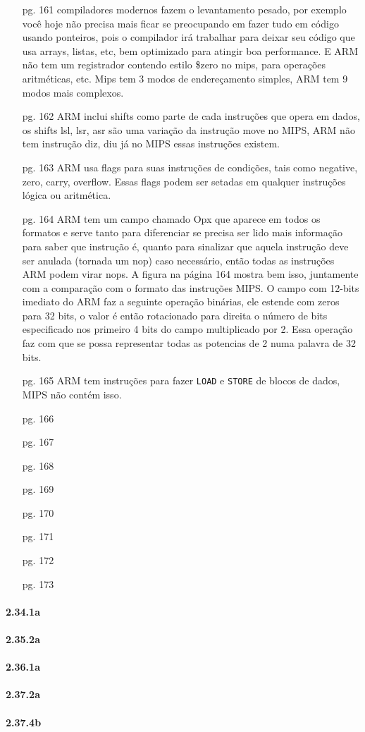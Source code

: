 \documentclass{article}
\begin{document}
\begin{enumerate}

\item[pg. 161] compiladores modernos fazem o levantamento pesado, por exemplo
você hoje não precisa mais ficar se preocupando em fazer tudo em código usando
ponteiros, pois o compilador irá trabalhar para deixar seu código que usa
arrays, listas, etc, bem optimizado para atingir boa performance. E ARM não tem
um registrador contendo estilo \$zero no mips, para operações aritméticas, etc.
Mips tem 3 modos de endereçamento simples, ARM tem 9 modos mais complexos.
\item[pg. 162] ARM inclui shifts como parte de cada instruções que opera em
dados, os shifts lsl, lsr, asr são uma variação da instrução move no MIPS, ARM
não tem instrução diz, diu já no MIPS essas instruções existem. \item[pg. 163]
ARM usa flags para suas instruções de condições, tais como negative, zero,
carry, overflow. Essas flags podem ser setadas em qualquer instruções lógica ou
aritmética.
\item[pg. 164] ARM tem um campo chamado Opx que aparece em todos os formatos e 
serve tanto para diferenciar se precisa ser lido mais informação para saber que 
instrução é, quanto para sinalizar que aquela instrução deve ser anulada 
(tornada um nop) caso necessário, então todas as instruções ARM podem virar 
nops. A figura na página 164 mostra bem isso, juntamente com a comparação com o 
formato das instruções MIPS. O campo com 12-bits imediato do ARM faz a seguinte 
operação binárias, ele estende com zeros para 32 bits, o valor é então 
rotacionado para direita o número de bits especificado nos primeiro 4 bits do 
campo multiplicado por 2. Essa operação faz com que se possa representar todas 
as potencias de 2 numa palavra de 32 bits.
\item[pg. 165] ARM tem instruções para fazer \verb|LOAD| e \verb|STORE| de 
blocos de dados, MIPS não contém isso.
\item[pg. 166]
\item[pg. 167]
\item[pg. 168]
\item[pg. 169]
\item[pg. 170]
\item[pg. 171]
\item[pg. 172]
\item[pg. 173]

\end{enumerate}

\paragraph{2.34.1a}
\paragraph{2.35.2a}
\paragraph{2.36.1a}
\paragraph{2.37.2a}
\paragraph{2.37.4b}
\end{document}
